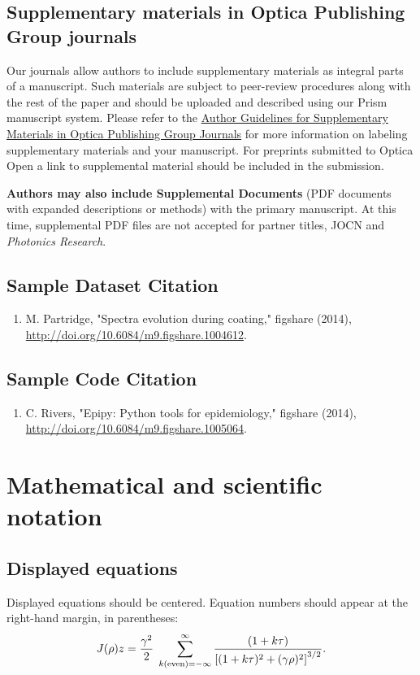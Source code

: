 \documentclass{optica-article}
\begin{document}
\subsection{Supplementary materials in Optica Publishing Group journals}
Our journals allow authors to include supplementary materials as integral parts of a manuscript. Such materials are subject to peer-review procedures along with the rest of the paper and should be uploaded and described using our Prism manuscript system. Please refer to the \href{https://opg.optica.org/submit/style/supplementary_materials.cfm}{Author Guidelines for Supplementary Materials in Optica Publishing Group Journals} for more information on labeling supplementary materials and your manuscript. For preprints submitted to Optica Open a link to supplemental material should be included in the submission.

\textbf{Authors may also include Supplemental Documents} (PDF documents with expanded descriptions or methods) with the primary manuscript. At this time, supplemental PDF files are not accepted for partner titles, JOCN and \emph{Photonics Research}. 

\subsection{Sample Dataset Citation}

\begin{enumerate}
\item M. Partridge, "Spectra evolution during coating," figshare (2014), \url{http://doi.org/10.6084/m9.figshare.1004612}.   
\end{enumerate}

\subsection{Sample Code Citation}

\begin{enumerate}
\item C. Rivers, "Epipy: Python tools for epidemiology," figshare (2014), 
\url{http://doi.org/10.6084/m9.figshare.1005064}.
\end{enumerate}

\section{Mathematical and scientific notation}

\subsection{Displayed equations} Displayed equations should be centered.
Equation numbers should appear at the right-hand margin, in
parentheses:
\begin{equation}
J(\rho)z =
 \frac{\gamma^2}{2} \; \sum_{k({\rm even}) = -\infty}^{\infty}
	\frac{(1 + k \tau)}{ \left[ (1 + k \tau)^2 + (\gamma  \rho)^2  \right]^{3/2} }.
\end{equation}
\end{document}
